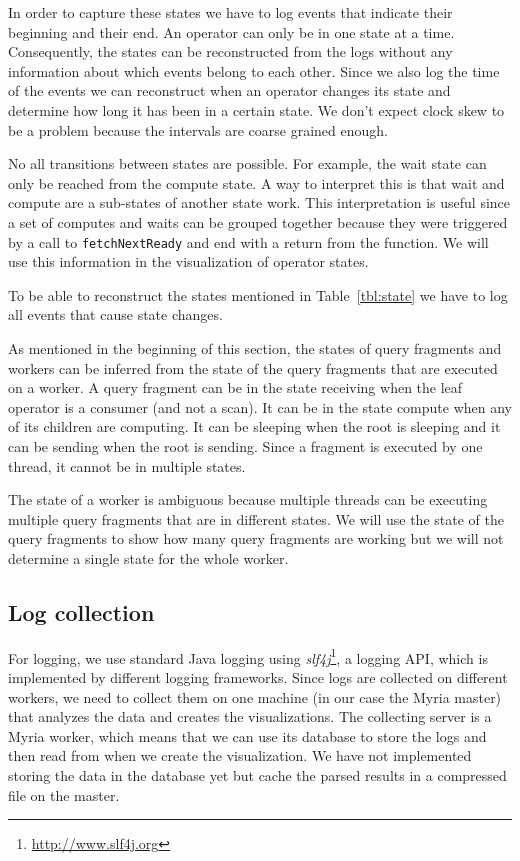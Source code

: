 \documentclass[11pt]{scrartcl}
\begin{document}
In order to capture these states we have to log events that indicate their beginning and their end. An operator can only be in one state at a time. Consequently, the states can be reconstructed from the logs without any information about which events belong to each other. Since we also log the time of the events we can reconstruct when an operator changes its state and determine how long it has been in a certain state. We don't expect clock skew to be a problem because the intervals are coarse grained enough.

No all transitions between states are possible. For example, the wait state can only be reached from the compute state. A way to interpret this is that wait and compute are a sub-states of another state work. This interpretation is useful since a set of computes and waits can be grouped together because they were triggered by a call to \texttt{fetchNextReady} and end with a return from the function. We will use this information in the visualization of operator states.

To be able to reconstruct the states mentioned in Table~\ref{tbl:state} we have to log all events that cause state changes.

As mentioned in the beginning of this section, the states of query fragments and workers can be inferred from the state of the query fragments that are executed on a worker. A query fragment can be in the state receiving when the leaf operator is a consumer (and not a scan). It can be in the state compute when any of its children are computing. It can be sleeping when the root is sleeping and it can be sending when the root is sending. Since a fragment is executed by one thread, it cannot be in multiple states.

The state of a worker is ambiguous because multiple threads can be executing multiple query fragments that are in different states. We will use the state of the query fragments to show how many query fragments are working but we will not determine a single state for the whole worker.


\subsection{Log collection}
\label{sec:collect}

For logging, we use standard Java logging using \emph{slf4j}\footnote{\url{http://www.slf4j.org}}, a logging API, which is implemented by different logging frameworks. Since logs are collected on different workers, we need to collect them on one machine (in our case the Myria master) that analyzes the data and creates the visualizations. The collecting server is a Myria worker, which means that we can use its database to store the logs and then read from when we create the visualization. We have not implemented storing the data in the database yet but cache the parsed results in a compressed file on the master.
\end{document}
